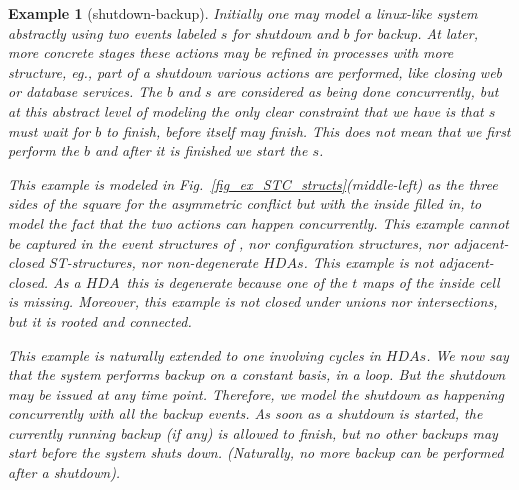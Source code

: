 \documentclass[submission,copyright,creativecommons]{eptcs}
\newtheorem{example}[theorem]{Example}
\newcommand{\cp}[1]{}
\newcommand\HDA{\ensuremath{\mathit{HDA}}}
\newcommand\HDAs{\ensuremath{\mathit{HDAs}}}
\begin{document}
\cp{
The \HDA\ from Figure~\ref{fig_ex_STC_structs}(v) can be expressed with STC-structure but under the multiple-cancellation steps since the $s$ temporarily cancels all the $b$ events except the current $b$ until both $s$ and $b$  (which can run in parallel) are finished; after this all the $b$ events are enabled again to run as a Kleene-star.
}

\begin{example}[shutdown-backup]\label{ex_shutdown}
Initially one may model a linux-like system abstractly using two events labeled ${s}$ for \textit{shutdown} and ${b}$ for \textit{backup}. At later, more concrete stages these actions may be refined in processes with more structure, eg., part of a shutdown various actions are performed, like closing web or database services. 
The ${b}$ and ${s}$ are considered as being done concurrently, but at this abstract level of modeling the only clear constraint that we have is that ${s}$ must wait for ${b}$ to finish, before itself may finish. 
This does not mean that we first perform the ${b}$ and after it is finished we start the ${s}$. 

This example is modeled in Fig.~\ref{fig_ex_STC_structs}(middle-left) as the three sides of the square for the asymmetric conflict but with the inside filled in, to model the fact that the two actions can happen concurrently. 
This example cannot be captured in the event structures of \cite{GlabbeekP09configStruct}, nor configuration structures, nor adjacent-closed ST-structures, nor non-degenerate \HDAs.
This example is not adjacent-closed. As a \HDA\ this is \textit{degenerate} because one of the $t$ maps of the inside cell is missing. Moreover, this example is not closed under unions nor intersections, but it is rooted and connected.



This example is naturally extended to one involving cycles in \HDAs.
We now say that the system performs \textit{backup on a constant basis}, in a loop. But the shutdown may be issued at any time point. Therefore, we model the shutdown as happening concurrently with all the backup events. As soon as a shutdown is started, the currently running backup (if any) is allowed to finish, but no other backups may start before the system shuts down. (Naturally, no more backup can be performed after a shutdown).


\end{example}
\end{document}
